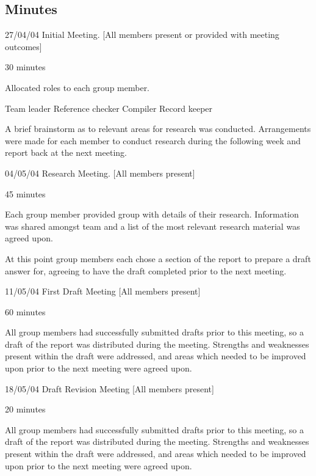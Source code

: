 \subsection{Minutes}

\item{27/04/04} Initial Meeting.
[All members present or provided with meeting outcomes]

 30 minutes

Allocated roles to each group member. 

 Team leader
 Reference checker
 Compiler
 Record keeper

A brief brainstorm as to relevant areas for research was conducted.
Arrangements were made for each member to conduct research during the following
week and report back at the next meeting.

\item{04/05/04} Research Meeting.
[All members present]

 45 minutes

Each group member provided group with details of their research. Information
was shared amongst team and a list of the most relevant research material was
agreed upon.

At this point group members each chose a section of the report to prepare a
draft answer for, agreeing to have the draft completed prior to the next
meeting.

\item{11/05/04} First Draft Meeting
[All members present]

 60 minutes

All group members had successfully submitted drafts prior to this meeting, so
a draft of the report was distributed during the meeting. Strengths and
weaknesses present within the draft were addressed, and areas which needed to
be improved upon prior to the next meeting were agreed upon.

\item{18/05/04} Draft Revision Meeting
[All members present]

 20 minutes

All group members had successfully submitted drafts prior to this meeting, so a
draft of the report was distributed during the meeting. Strengths and
weaknesses present within the draft were addressed, and areas which needed to
be improved upon prior to the next meeting were agreed upon.

